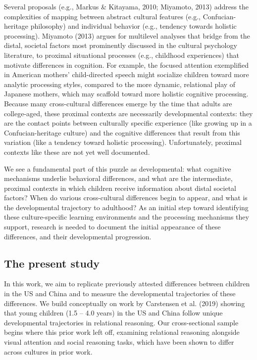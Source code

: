 \documentclass[10pt, letterpaper]{article}
\begin{document}
Several proposals (e.g., Markus \& Kitayama, 2010; Miyamoto, 2013)
address the complexities of mapping between abstract cultural features
(e.g., Confucian-heritage philosophy) and individual behavior (e.g.,
tendency towards holistic processing). Miyamoto (2013) argues for
multilevel analyses that bridge from the distal, societal factors most
prominently discussed in the cultural psychology literature, to proximal
situational processes (e.g., childhood experiences) that motivate
differences in cognition. For example, the focused attention exemplified
in American mothers' child-directed speech might socialize children
toward more analytic processing styles, compared to the more dynamic,
relational play of Japanese mothers, which may scaffold toward more
holistic cognitive processing. Because many cross-cultural differences
emerge by the time that adults are college-aged, these proximal contexts
are necessarily developmental contexts: they are the contact points
between culturally specific experience (like growing up in a
Confucian-heritage culture) and the cognitive differences that result
from this variation (like a tendency toward holistic processing).
Unfortunately, proximal contexts like these are not yet well documented.

We see a fundamental part of this puzzle as developmental: what
cognitive mechanisms underlie behavioral differences, and what are the
intermediate, proximal contexts in which children receive information
about distal societal factors? When do various cross-cultural
differences begin to appear, and what is the developmental trajectory to
adulthood? As an initial step toward identifying these culture-specific
learning environments and the processing mechanisms they support,
research is needed to document the initial appearance of these
differences, and their developmental progression.

\hypertarget{the-present-study}{%
\subsection{The present study}\label{the-present-study}}

In this work, we aim to replicate previously attested differences
between children in the US and China and to measure the developmental
trajectories of these differences. We build conceptually on work by
Carstensen et al. (2019) showing that young children (1.5 -- 4.0 years)
in the US and China follow unique developmental trajectories in
relational reasoning. Our cross-sectional sample begins where this prior
work left off, examining relational reasoning alongside visual attention
and social reasoning tasks, which have been shown to differ across
cultures in prior work.
\end{document}
